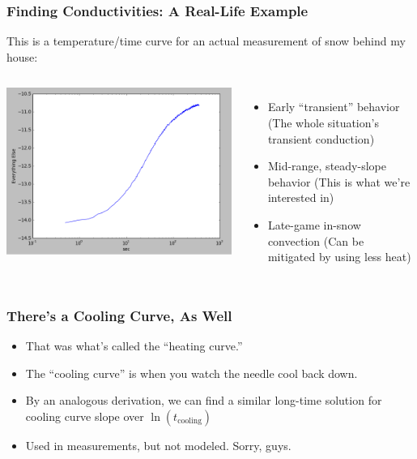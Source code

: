 \documentclass{beamer}
\begin{document}
\begin{frame}
\frametitle{Finding Conductivities: A Real-Life Example}

This is a temperature/time curve for an actual measurement of snow behind my
house:

\begin{columns}[c]
    \includegraphics[width=\textwidth]{fig/measurement_graph.png}
    \begin{itemize}
    \item Early ``transient'' behavior (The whole situation's transient conduction)
    \item Mid-range, steady-slope behavior (This is what we're interested in)
    \item Late-game in-snow convection (Can be mitigated by using less heat)
    \end{itemize}
\end{columns}
\end{frame}


\begin{frame}
\frametitle{There's a Cooling Curve, As Well}
\begin{itemize}
\item That was what's called the ``heating curve.''
\item The ``cooling curve'' is when you watch the needle cool back down.
\item By an analogous derivation, we can find a similar long-time solution for
cooling curve slope over \(\ln(t_{\textrm{cooling}})\)
\item Used in measurements, but not modeled. Sorry, guys.
\end{itemize}
\end{frame}
\end{document}
